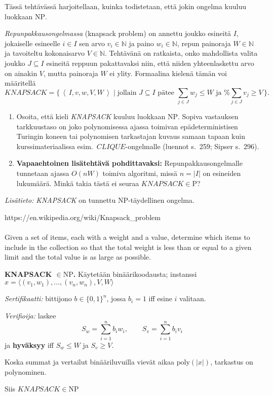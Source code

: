 \documentclass[12pt,a4paper]{article}
\newcommand{\abs}[1]{\lvert#1\rvert}
\newcommand{\N}{\mathbb{N}}
\newcommand{\NPee}{\mathrm{NP}}
\newcommand{\code}[1]{\left\langle\,#1\,\right\rangle}
\newcommand{\Pee}{\mathrm{P}}
\begin{document}
\pagebreak
\exercise{2 Luokan $\NPee$ ongelmat.} Tässä tehtävässä harjoitellaan, kuinka todistetaan, että jokin ongelma kuuluu luokkaan $\NPee$.
  
{\em Repunpakkausongelmassa} (knapsack problem)
on annettu joukko esineitä $I$, jokaiselle esineelle $i\in I$
sen arvo $v_i\in\N$ ja paino $w_i\in\N$, repun painoraja $W\in\N$
ja tavoiteltu kokonaisarvo $V\in\N$.
Tehtävänä on ratkaista, onko mahdollista valita joukko $J\subseteq I$
esineitä reppuun pakattavaksi niin, että niiden yhteenlaskettu
arvo on ainakin $V$, mutta painoraja $W$ ei ylity.
Formaalina kielenä tämän voi määritellä
\[\mathit{KNAPSACK}=\{\,\code{I,v,w,V,W}\mid
\mbox{jollain $J\subseteq I$ pätee $\sum_{j\in J}w_j\leq W$ ja %
$\sum_{j\in J}v_j\geq V$}\,\}.\]
\begin{enumerate}
\item
Osoita, että kieli {\it KNAPSACK} kuuluu luokkaan $\NPee$.
Sopiva vastauksen tarkkuustaso on joko polynomisessa ajassa toimivan
epädeterministisen Turingin koneen tai polynomisen tarkastajan
kuvaus samaan tapaan kuin kurssimateriaalissa esim.\ 
$\mathit{CLIQUE}$-ongelmalle (luennot s.\ 259; Sipser s.\ 296).
\item {\bf Vapaaehtoinen lisätehtävä pohdittavaksi:} 
Repunpakkausongelmalle tunnetaan ajassa $O(nW)$ toimiva algoritmi,
missä $n=\abs{I}$ on esineiden lukumäärä.
Minkä takia
tästä ei seuraa $\mathit{KNAPSACK}\in\Pee$?
\end{enumerate}
{\em Lisätieto:} {\it KNAPSACK} on tunnettu NP-täydellinen ongelma.

\bigskip



https://en.wikipedia.org/wiki/Knapsack\_problem

\paragraph{} Given a set of items, each with a weight and a value, determine which items to include in the collection so that the total weight is less than or equal to a given limit and the total value is as large as possible.

\bigskip

\begin{alakohta}
\item \textbf{KNAPSACK $\in \NPee$.}
Käytetään binäärikoodausta; instanssi
$x=\langle (v_1,w_1),\ldots,(v_n,w_n),V,W\rangle$

\emph{Sertifikaatti:} bittijono $b\in\{0,1\}^n$, jossa $b_i=1$
iff esine $i$ valitaan.

\emph{Verifioija:} laskee
\[
S_w=\sum_{i=1}^n b_i w_i,\qquad S_v=\sum_{i=1}^n b_i v_i
\]
ja \textbf{hyväksyy} iff $S_w\le W$ ja $S_v\ge V$.

Koska summat ja vertailut binääriluvuilla vievät aikaa
$\mathrm{poly}(|x|)$, tarkastus on polynominen. 

Siis 
$\mathit{KNAPSACK}\in\NPee$
\end{alakohta}
\end{document}
